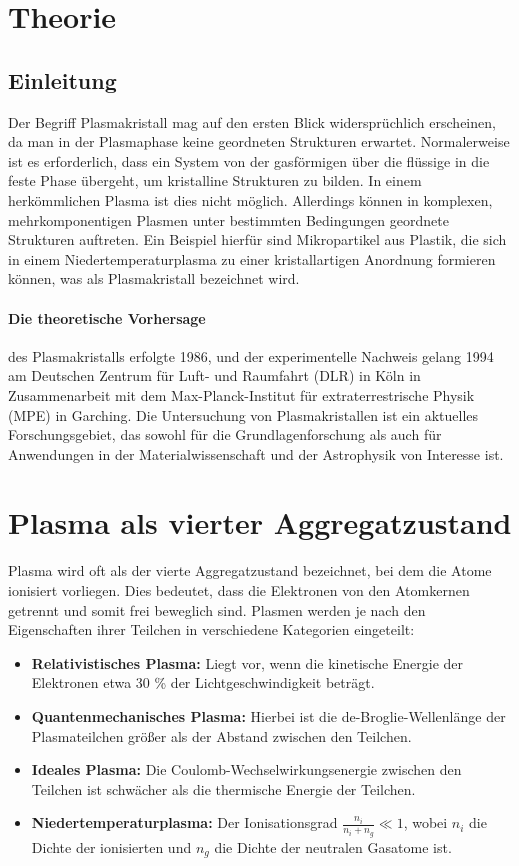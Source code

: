\documentclass[12pt,a4paper,ngerman]{article}
\begin{document}
\section{Theorie}
\subsection{Einleitung} Der Begriff \glqq{}Plasmakristall\grqq{} mag auf den ersten Blick widersprüchlich erscheinen, da man in der Plasmaphase keine geordneten Strukturen erwartet. Normalerweise ist es erforderlich, dass ein System von der gasförmigen über die flüssige in die feste Phase übergeht, um kristalline Strukturen zu bilden. In einem herkömmlichen Plasma ist dies nicht möglich. Allerdings können in komplexen, mehrkomponentigen Plasmen unter bestimmten Bedingungen geordnete Strukturen auftreten. Ein Beispiel hierfür sind Mikropartikel aus Plastik, die sich in einem Niedertemperaturplasma zu einer kristallartigen Anordnung formieren können, was als Plasmakristall bezeichnet wird.

\paragraph{Die theoretische Vorhersage} des Plasmakristalls erfolgte 1986, und der experimentelle Nachweis gelang 1994 am Deutschen Zentrum für Luft- und Raumfahrt (DLR) in Köln in Zusammenarbeit mit dem Max-Planck-Institut für extraterrestrische Physik (MPE) in Garching. Die Untersuchung von Plasmakristallen ist ein aktuelles Forschungsgebiet, das sowohl für die Grundlagenforschung als auch für Anwendungen in der Materialwissenschaft und der Astrophysik von Interesse ist.

\section{Plasma als vierter Aggregatzustand}
Plasma wird oft als der vierte Aggregatzustand bezeichnet, bei dem die Atome ionisiert vorliegen. Dies bedeutet, dass die Elektronen von den Atomkernen getrennt und somit frei beweglich sind. Plasmen werden je nach den Eigenschaften ihrer Teilchen in verschiedene Kategorien eingeteilt:

\begin{itemize}
    \item \textbf{Relativistisches Plasma:} Liegt vor, wenn die kinetische Energie der Elektronen etwa 30 \% der Lichtgeschwindigkeit beträgt.
    \item \textbf{Quantenmechanisches Plasma:} Hierbei ist die de-Broglie-Wellenlänge der Plasmateilchen größer als der Abstand zwischen den Teilchen.
    \item \textbf{Ideales Plasma:} Die Coulomb-Wechselwirkungsenergie zwischen den Teilchen ist schwächer als die thermische Energie der Teilchen.
    \item \textbf{Niedertemperaturplasma:} Der Ionisationsgrad \( \frac{n_i}{n_i + n_g} \ll 1 \), wobei \( n_i \) die Dichte der ionisierten und \( n_g \) die Dichte der neutralen Gasatome ist.
\end{itemize}
\end{document}
